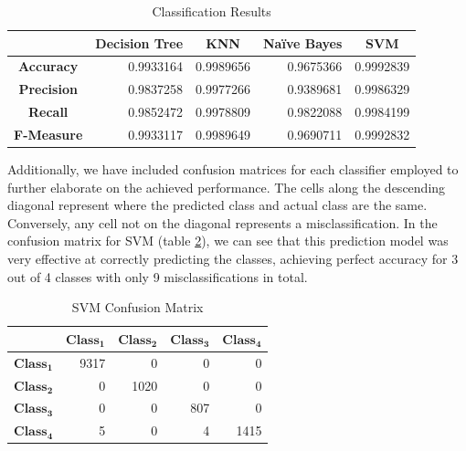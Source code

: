 \documentclass[letterpaper, 10 pt, conference]{ieeeconf}  %
\begin{document}
\begin{table}[htb]
    \centering
    \begin{tabular}{|r|r|r|r|r|}
        \hline
        & \multicolumn{1}{c|}{\textbf{Decision Tree}} & \multicolumn{1}{c|}{\textbf{KNN}} & \multicolumn{1}{c|}{\textbf{Na\"{i}ve Bayes}} & \multicolumn{1}{c|}{\textbf{SVM}} \\
        \hline
        \multicolumn{1}{|c|}{\textbf{Accuracy}} & 0.9933164 & 0.9989656 & 0.9675366 & 0.9992839 \\
        \hline
        \multicolumn{1}{|c|}{\textbf{Precision}} & 0.9837258 & 0.9977266 & 0.9389681 & 0.9986329 \\
        \hline
        \multicolumn{1}{|c|}{\textbf{Recall}} & 0.9852472 & 0.9978809 & 0.9822088 & 0.9984199 \\
        \hline
        \multicolumn{1}{|c|}{\textbf{F-Measure}} & 0.9933117 & 0.9989649 & 0.9690711 & 0.9992832 \\
        \hline
    \end{tabular}
    \caption{Classification Results}
    \label{tab:class_results}
\end{table}

Additionally, we have included confusion matrices for each classifier employed to further elaborate on the achieved performance. The cells along the descending diagonal represent where the predicted class and actual class are the same. Conversely, any cell not on the diagonal represents a misclassification. In the confusion matrix for SVM (table \ref{tab:SVM_CM}), we can see that this prediction model was very effective at correctly predicting the classes, achieving perfect accuracy for 3 out of 4 classes with only 9 misclassifications in total. 

\begin{table}[htb]
    \centering
    \begin{tabular}{|c|r|r|r|r|}
        \hline
        & \multicolumn{1}{c|}{$\boldsymbol{Class_1}$} & \multicolumn{1}{c|}{$\boldsymbol{Class_2}$} & \multicolumn{1}{c|}{$\boldsymbol{Class_3}$} & \multicolumn{1}{c|}{$\boldsymbol{Class_4}$} \\
        \hline
        $\boldsymbol{Class_1}$ & 9317 & 0 & 0 & 0 \\
        \hline
        $\boldsymbol{Class_2}$ & 0 & 1020 &  0 & 0 \\
        \hline
        $\boldsymbol{Class_3}$ & 0 & 0 & 807 & 0 \\
        \hline
        $\boldsymbol{Class_4}$ & 5 & 0 & 4 & 1415 \\
        \hline
 
    \end{tabular}
    \caption{SVM Confusion Matrix}
    \label{tab:SVM_CM}
\end{table}
\end{document}
